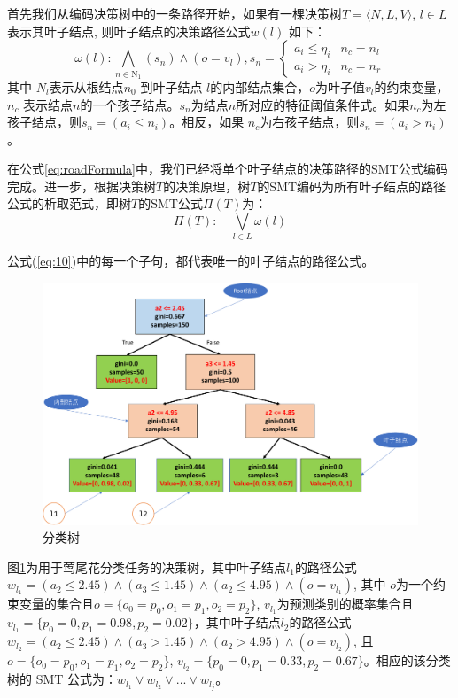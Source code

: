 首先我们从编码决策树中的一条路径开始，如果有一棵决策树$T = \langle N,L,V \rangle$,  $ l \in L$表示其叶子结点, 则叶子结点的决策路径公式$w(l)$ 如下：
\begin{equation}\label{eq:roadFormula}
\omega(l): \bigwedge_{n \in \mathrm{N}_{1}}\left(s_{n}\right) \wedge\left(o=v_{l}\right), s_{n}=\left\{\begin{array}{ll}
a_{i} \leq \eta_{i} & n_{c}=n_{l} \\
a_{i}>\eta_{i} & n_{c}=n_{r}
\end{array}\right.
\end{equation}
其中 $N_l$表示从根结点$n_0$ 到叶子结点 $l$的内部结点集合，$o$为叶子值$v_l$的约束变量，$n_c$ 表示结点$n$的一个孩子结点。$s_n$为结点$n$所对应的特征阈值条件式。如果$n_c$为左孩子结点，则$s_n=(a_i\le n_i)$。相反，如果 $n_c$为右孩子结点，则$s_n=(a_i > n_i)$。

在公式\ref{eq:roadFormula}中，我们已经将单个叶子结点的决策路径的SMT公式编码完成。进一步，根据决策树$T$的决策原理，树$T$的SMT编码为所有叶子结点的路径公式的析取范式，即树$T$的SMT公式$\Pi(T)$为：
\begin{equation}\label{eq:10}
\Pi(T): \quad \bigvee_{l \in L} \omega(l)
\end{equation}

公式(\ref{eq:10})中的每一个子句，都代表唯一的叶子结点的路径公式。

\begin{figure}[!hbt]
\centering
	\includegraphics[scale=0.5]{fig2/C3/FLJCS.pdf}%
	\caption{分类树}
	\label{fig:分类树结构图}	
\end{figure}

\begin{ex}[分类决策树的SMT公式]\label{分类决策树例子}
图\ref{fig:分类树结构图}为用于莺尾花分类任务的决策树，其中叶子结点$l_1$的路径公式$w_{l_{1}} = (a_2 \le 2.45) \wedge (a_3 \le 1.45) \wedge (a_2 \le 4.95) \wedge (o = v_{l_{1}})$, 其中 $o$为一个约束变量的集合且$o=\{ o_0=p_0, o_1=p_1,o_2=p_2\}$, $v_{l_{1}}$为预测类别的概率集合且$v_{l_{1}}=\{p_0=0,p_1=0.98,p_2=0.02\}$，其中叶子结点$l_2$的路径公式$w_{l_{2}} = (a_2 \le 2.45) \wedge (a_3 > 1.45) \wedge (a_2 > 4.95) \wedge (o = v_{l_{2}})$, 且$o=\{ o_0=p_0, o_1=p_1,o_2=p_2\}$, $v_{l_{2}}=\{p_0=0,p_1=0.33,p_2=0.67\}$。相应的该分类树的 SMT 公式为：$w_{l_{1}} \vee w_{l_{2}} \vee ... \vee w_{l_{j}}$。
\end{ex}

